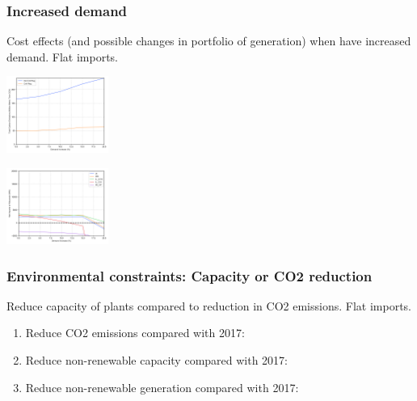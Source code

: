 \documentclass[xcolor=dvipsnames]{beamer}
\begin{document}
\begin{frame}
  \frametitle{Increased demand}

Cost effects (and possible changes in portfolio of generation) when
have increased demand.  Flat imports.




\includegraphics[width=0.25\textwidth]{includes/demand_up_emissions.png}

\includegraphics[width=0.25\textwidth]{includes/demand_up_net_imports.png}



\end{frame}





\begin{frame}
  \frametitle{Environmental constraints: Capacity or CO2 reduction}

Reduce capacity of plants compared to reduction in CO2 emissions. Flat imports.
\begin{enumerate}
\item Reduce \alert{CO2 emissions} compared with 2017:
\item Reduce \alert{non-renewable capacity} compared with 2017:
\item Reduce \alert{non-renewable generation} compared with 2017:
\end{enumerate}

\end{frame}
\end{document}

